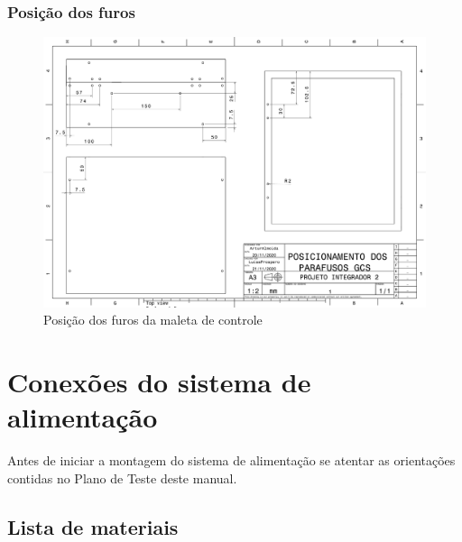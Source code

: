 \subsubsection{Posição dos furos}

\begin{figure}[H]
    \centering
    \includegraphics[width=1\textwidth]{Figuras/montagemMaletasEstrutura/POSICIONAMENTO PARAFUSOS GCS.pdf}
    \caption{Posição dos furos da maleta de controle}
    \label{fig:maletaControlePosicaoFuro}
\end{figure}

\section{Conexões do sistema de alimentação}

Antes de iniciar a montagem do sistema de alimentação se atentar as orientações contidas no Plano de Teste deste manual.

\subsection*{Lista de materiais}

